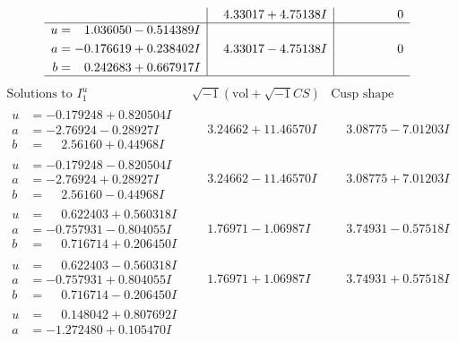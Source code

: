 \documentclass[1p]{elsarticle_modified}
\theoremstyle{definition}
\newcommand{\I}{\sqrt{-1}}
\begin{document}
$$\begin{array}{c|c|c}
 & \phantom{-}4.33017 + 4.75138 I & \phantom{-0.000000 } 0 \\ \hline\begin{aligned}
u &= \phantom{-}1.036050 - 0.514389 I \\
a &= -0.176619 + 0.238402 I \\
b &= \phantom{-}0.242683 + 0.667917 I\end{aligned}
 & \phantom{-}4.33017 - 4.75138 I & \phantom{-0.000000 } 0\\
 \hline 
 \end{array}$$\newpage$$\begin{array}{c|c|c}  
\text{Solutions to }I^u_{1}& \I (\text{vol} + \sqrt{-1}CS) & \text{Cusp shape}\\
 \hline 
\begin{aligned}
u &= -0.179248 + 0.820504 I \\
a &= -2.76924 - 0.28927 I \\
b &= \phantom{-}2.56160 + 0.44968 I\end{aligned}
 & \phantom{-}3.24662 + 11.46570 I & \phantom{-}3.08775 - 7.01203 I \\ \hline\begin{aligned}
u &= -0.179248 - 0.820504 I \\
a &= -2.76924 + 0.28927 I \\
b &= \phantom{-}2.56160 - 0.44968 I\end{aligned}
 & \phantom{-}3.24662 - 11.46570 I & \phantom{-}3.08775 + 7.01203 I \\ \hline\begin{aligned}
u &= \phantom{-}0.622403 + 0.560318 I \\
a &= -0.757931 - 0.804055 I \\
b &= \phantom{-}0.716714 + 0.206450 I\end{aligned}
 & \phantom{-}1.76971 - 1.06987 I & \phantom{-}3.74931 - 0.57518 I \\ \hline\begin{aligned}
u &= \phantom{-}0.622403 - 0.560318 I \\
a &= -0.757931 + 0.804055 I \\
b &= \phantom{-}0.716714 - 0.206450 I\end{aligned}
 & \phantom{-}1.76971 + 1.06987 I & \phantom{-}3.74931 + 0.57518 I \\ \hline\begin{aligned}
u &= \phantom{-}0.148042 + 0.807692 I \\
a &= -1.272480 + 0.105470 I \\

\end{aligned}
\end{array}$$
\end{document}
